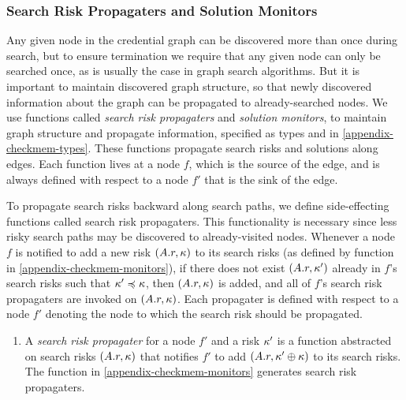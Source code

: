 \subsubsection{Search Risk Propagaters and Solution Monitors}

Any given node in the credential graph can be discovered more than
once during search, but to ensure termination we require that any
given node can only be searched once, as is usually the case in graph
search algorithms.  But it is important to maintain discovered graph
structure, so that newly discovered information about the graph can be
propagated to already-searched nodes.  We use functions called
\emph{search risk propagaters} and \emph{solution monitors}, to
maintain graph structure and propagate information, specified as types
 and  in
\autoref{appendix-checkmem-types}.  These functions propagate search
risks and solutions along edges.  Each function lives at a node $f$,
which is the source of the edge, and is always defined with respect to
a node $f'$ that is the sink of the edge.  

To propagate search risks backward along search paths, we define
side-effecting functions called search risk propagaters.  This
functionality is necessary since less risky search paths may be
discovered to already-visited nodes.  Whenever a node $f$ is notified
to add a new risk $(A.r,\kappa)$ to its search risks (as defined by
function  in \autoref{appendix-checkmem-monitors}),
if there does not exist $(A.r,\kappa')$ already in $f$'s search risks
such that $\kappa' \preccurlyeq \kappa$, then $(A.r,\kappa)$ is added, and all of
$f$'s search risk propagaters are invoked on $(A.r, \kappa)$.  Each
propagater is defined with respect to a node $f'$ denoting the node to
which the search risk should be propagated.
\begin{enumerate}[\hspace{11pt}]
\item A \emph{search risk propagater} for a node $f'$ and a risk
$\kappa'$ is a function abstracted on search risks $(A.r,\kappa)$ that
notifies $f'$ to add $(A.r, \kappa' \oplus \kappa)$ to its search
risks.  The function  in
\autoref{appendix-checkmem-monitors} generates search risk
propagaters.
\end{enumerate}

